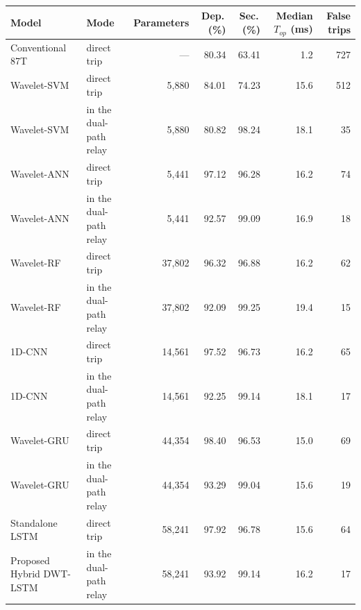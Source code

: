 \begin{tabular}{@{}llrrrrr@{}}\toprule
Model & Mode & Parameters & Dep.\,(\%) & Sec.\,(\%) & Median $T_{op}$ (ms) & False trips\\ \midrule
Conventional 87T & direct trip & --- & 80.34 & 63.41 & 1.2 & 727\\
Wavelet-SVM & direct trip & 5{,}880 & 84.01 & 74.23 & 15.6 & 512\\
Wavelet-SVM & in the dual-path relay & 5{,}880 & 80.82 & 98.24 & 18.1 & 35\\
Wavelet-ANN & direct trip & 5{,}441 & 97.12 & 96.28 & 16.2 & 74\\
Wavelet-ANN & in the dual-path relay & 5{,}441 & 92.57 & 99.09 & 16.9 & 18\\
Wavelet-RF & direct trip & 37{,}802 & 96.32 & 96.88 & 16.2 & 62\\
Wavelet-RF & in the dual-path relay & 37{,}802 & 92.09 & 99.25 & 19.4 & 15\\
1D-CNN & direct trip & 14{,}561 & 97.52 & 96.73 & 16.2 & 65\\
1D-CNN & in the dual-path relay & 14{,}561 & 92.25 & 99.14 & 18.1 & 17\\
Wavelet-GRU & direct trip & 44{,}354 & 98.40 & 96.53 & 15.0 & 69\\
Wavelet-GRU & in the dual-path relay & 44{,}354 & 93.29 & 99.04 & 15.6 & 19\\
Standalone LSTM & direct trip & 58{,}241 & 97.92 & 96.78 & 15.6 & 64\\
Proposed Hybrid DWT-LSTM & in the dual-path relay & 58{,}241 & 93.92 & 99.14 & 16.2 & 17\\
\bottomrule
\end{tabular}